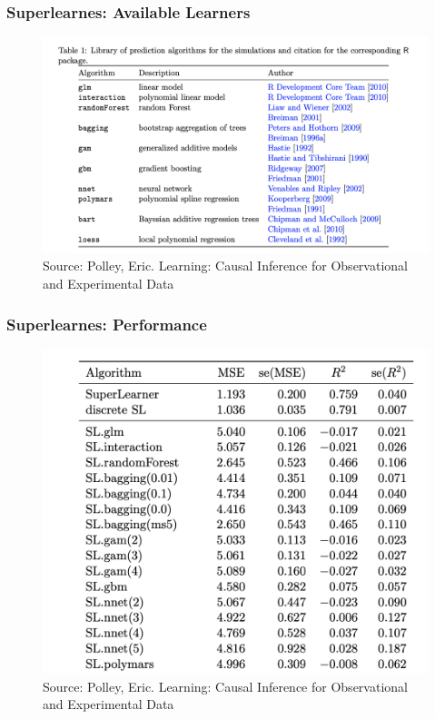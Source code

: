 \documentclass[
  shownotes,
  xcolor={svgnames},
  hyperref={colorlinks,citecolor=DarkBlue,linkcolor=DarkRed,urlcolor=DarkBlue}
  , aspectratio=169]{beamer}
\begin{document}
\begin{frame}[fragile]
\frametitle{Superlearnes: Available Learners}



  \begin{figure}[H] \centering
            \captionsetup{justification=centering}
              \includegraphics[scale=0.4]{figures/sl_algorithms.png}
              \\
              \tiny
              Source: Polley, Eric. Learning: Causal Inference for Observational and Experimental Data
 \end{figure}

 \end{frame}
\begin{frame}[fragile]
\frametitle{Superlearnes: Performance}



  \begin{figure}[H] \centering
            \captionsetup{justification=centering}
              \includegraphics[scale=0.5]{figures/sL_results.png}
              \\
              \tiny
              Source: Polley, Eric. Learning: Causal Inference for Observational and Experimental Data
 \end{figure}


\end{frame}
\end{document}
